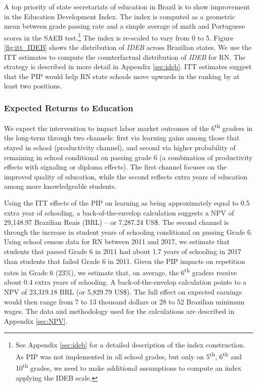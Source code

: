 \documentclass[11pt,a4paper]{article}
\begin{document}
	A top priority of state secretariats of education in Brazil is to show improvement in the Education Development Index. The index is computed as a geometric mean between grade passing rate and a simple average of math and Portuguese scores in the SAEB test.\footnote{See Appendix \ref{sec:ideb} for a detailed description of the index construction. As PIP was not implemented in all school grades, but only on 5\textsuperscript{th}, 6\textsuperscript{th} and 10\textsuperscript{th} grades, we need to make additional assumptions to compute an index applying the IDEB scale.} The index is re-scaled to vary from 0 to 5. Figure \ref{fig:itt_IDEB} shows the distribution of \textit{IDEB} across Brazilian states. We use the ITT estimates to compute the counterfactual distribution of \textit{IDEB} for RN. The strategy is described in more detail in Appendix \ref{sec:ideb}. ITT estimates suggest that the PIP would help RN state schools move upwards in the ranking by at least two positions.
	
	\subsubsection*{Expected Returns to Education} 
	
	We expect the intervention to impact labor market outcomes of the 6\textsuperscript{th} graders in the long-term through two channels: first via learning gains among those that stayed in school (productivity channel), and second via higher probability of remaining in school conditional on passing grade 6 (a combination of productivity effects with signaling or diploma effects). The first channel focuses on the improved quality of education, while the second reflects extra years of education among more knowledgeable students.
	
	Using the ITT effects of the PIP on learning as being approximately equal to 0.5 extra year of schooling, a back-of-the-envelop calculation suggests a NPV of 29,148.97 Brazilian Reais (BRL) -- or 7,287.24 US\$. The second channel is through the increase in student years of schooling conditional on passing Grade 6. Using school census data for RN between 2011 and 2017, we estimate that students that passed Grade 6 in 2011 had about 1.7 years of schooling in 2017 than students that failed Grade 6 in 2011. Given the PIP impacts on repetition rates in Grade 6 (23\%), we estimate that, on average, the 6\textsuperscript{th} graders receive about 0.4 extra years of schooling. A back-of-the-envelop calculation points to a NPV of 23,319.18 BRL (or 5,829.79 US\$). The full effect on expected earnings would then range from 7 to 13 thousand dollars or 28 to 52 Brazilian minimum wages. The data and methodology used for the calculations are described in Appendix \ref{sec:NPV}. 
	
\end{document}
